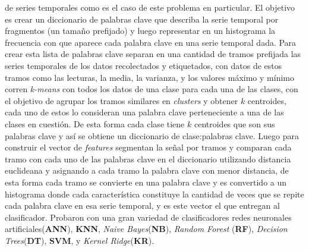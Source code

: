 de series temporales como es el caso de este problema en particular. El objetivo es crear un diccionario de palabras clave que describa la serie temporal
por fragmentos (un tamaño prefijado) y luego representar en un histograma la frecuencia con que aparece cada palabra clave en una serie temporal dada.
Para crear esta lista de palabras clave separan en una cantidad de tramos prefijada las series temporales de los datos recolectados y etiquetados, con
datos de estos tramos como las lecturas, la media, la varianza, y los valores máximo y mínimo corren \emph{k-means} con todos los datos de una clase para
cada una de las clases, con el objetivo de agrupar los tramos similares en \emph{clusters} y obtener $k$ centroides, cada uno de estos lo consideran una
palabra clave perteneciente a una de las clases en cuestión. De esta forma cada clase tiene $k$ centroides que son sus palabras clave y así se obtiene 
un diccionario de clase:palabras clave. Luego para construir el vector de \emph{features} segmentan la señal por tramos y comparan cada tramo con cada
uno de las palabras clave en el diccionario utilizando distancia euclideana y asignando a cada tramo la palabra clave con menor distancia, de esta forma
cada tramo se convierte en una palabra clave y es convertido a un histograma donde cada característica constituye la cantidad de veces que se repite cada
palabra clave en esa serie temporal, y es este vector el que entregan al clasificador. Probaron con una gran variedad de clasificadores redes neuronales
artificiales(\textbf{ANN}), \textbf{KNN}, \emph{Naive Bayes}(\textbf{NB}), \emph{Random Forest} (\textbf{RF}), \emph{Decision Trees}(\textbf{DT}),
\textbf{SVM}, y \emph{Kernel Ridge}(\textbf{KR}).\\
